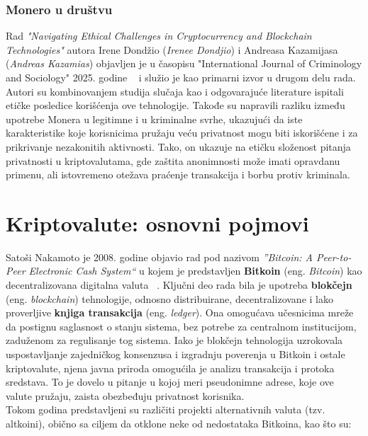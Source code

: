 \documentclass[12pt,a4paper]{article}
\begin{document}
\subsubsection{Monero u društvu}
Rad \textit{"Navigating Ethical Challenges in Cryptocurrency and Blockchain Technologies"} autora Irene Dondžio (\textit{Irenee Dondjio}) i Andreasa Kazamijasa (\textit{Andreas Kazamias}) objavljen je u časopisu "International Journal of Criminology and Sociology"  2025. godine ~\cite{ethicalChallenges} i služio je kao primarni izvor u drugom delu rada. Autori su kombinovanjem studija slučaja kao i odgovarajuće literature ispitali etičke posledice korišćenja ove tehnologije. Takođe su napravili razliku između upotrebe Monera u legitimne i u kriminalne svrhe, ukazujući da iste karakteristike koje korisnicima pružaju veću privatnost mogu biti iskorišćene i za prikrivanje nezakonitih aktivnosti. Tako, on ukazuje na etičku složenost  pitanja privatnosti u kriptovalutama, gde zaštita anonimnosti može imati opravdanu primenu, ali istovremeno otežava praćenje transakcija i borbu protiv kriminala.

\newpage
\section{Kriptovalute: osnovni pojmovi}

Satoši Nakamoto je 2008. godine objavio rad pod nazivom \textit{”Bitcoin: A Peer-to-Peer Electronic Cash System“} u kojem je predstavljen \textbf{Bitkoin} (eng. \textit{Bitcoin}) kao decentralizovana digitalna valuta ~\cite{satoshi}. Ključni deo rada bila je upotreba \textbf{blokčejn} (eng. \textit{blockchain}) tehnologije, odnosno distribuirane, decentralizovane i lako proverljive \textbf{knjiga transakcija} (eng. \textit{ledger}). Ona omogućava učesnicima mreže da postignu saglasnost o stanju sistema, bez potrebe za centralnom institucijom, zaduženom za regulisanje tog sistema.  Iako je blokčejn tehnologija uzrokovala uspostavljanje zajedničkog konsenzusa i izgradnju poverenja u Bitkoin i ostale kriptovalute, njena javna priroda omogućila je analizu transakcija i protoka sredstava. To je dovelo u pitanje u kojoj meri pseudonimne adrese, koje ove valute pružaju, zaista obezbeđuju privatnost korisnika.\\

Tokom godina predstavljeni su različiti projekti alternativnih valuta (tzv. altkoini), obično sa ciljem da otklone neke od nedostataka Bitkoina, kao što su:
\end{document}
